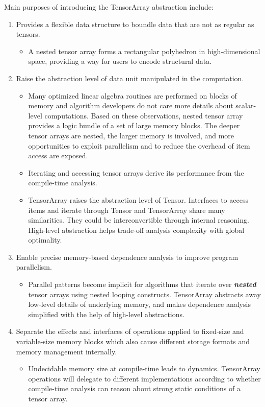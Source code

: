 Main purposes of introducing the TensorArray abstraction include:
\begin{enumerate}
  \item Provides a flexible data structure to boundle data that are not as regular as tensors.

  \begin{itemize}
    \item A nested tensor array forms a rectangular polyhedron in high-dimensional space, providing a way for users to encode structural data.
  \end{itemize}

  \item Raise the abstraction level of data unit manipulated in the computation.
  \begin{itemize}
    \item Many optimized linear algebra routines are performed on blocks of memory and algorithm developers do not care more details about scalar-level computations. Based on these observations, nested tensor array provides a logic bundle of a set of large memory blocks. The deeper tensor arrays are nested, the larger memory is involved, and more opportunities to exploit parallelism and to reduce the overhead of item access are exposed.
    \item Iterating and accessing tensor arrays derive its performance from the compile-time analysis.
    \item TensorArray raises the abstraction level of Tensor. Interfaces to access items and iterate through Tensor and TensorArray share many similarities. They could be interconvertible through internal reasoning. High-level abstraction helps trade-off analysis complexity with global optimality.
  \end{itemize}

  \item Enable precise memory-based dependence analysis to improve program parallelism.

  \begin{itemize}
    \item Parallel patterns become implicit for algorithms that iterate over \textit{\textbf{nested}} tensor arrays using nested looping constructs. TensorArray abstracts away low-level details of underlying memory, and makes dependence analysis simplified with the help of high-level abstractions.
  \end{itemize}

  \item Separate the effects and interfaces of operations applied to fixed-size and variable-size memory blocks which also cause different storage formats and memory management internally.

  \begin{itemize}
    \item Undecidable memory size at compile-time leads to dynamics. TensorArray operations will delegate to different implementations according to whether compile-time analysis can reason about strong static conditions of a tensor array.
  \end{itemize}

\end{enumerate}

